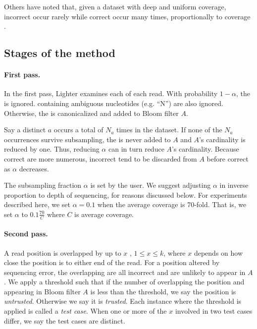 \documentclass{bmcart}
\begin{document}
Others have noted that, given a dataset with deep and uniform coverage, incorrect \kmers occur rarely while correct \kmers occur many times, proportionally to coverage \cite{pevzner2001eulerian, chaisson2004fragment}.

\subsection*{Stages of the method}
\paragraph{First pass.}    In the first pass, Lighter examines each \kmer of each read.  With probability $1 - \alpha$, the \kmer is ignored.  \kmers containing ambiguous nucleotides (e.g. ``N'') are also ignored.  Otherwise, the \kmer is canonicalized and added to Bloom filter $A$.

Say a distinct \kmer $a$ occurs a total of $N_a$ times in the dataset.  If none of the $N_a$ occurrences survive subsampling, the \kmer is never added to $A$ and $A$'s cardinality is reduced by one.  Thus, reducing $\alpha$ can in turn reduce $A$'s cardinality.  Because correct \kmers are more numerous, incorrect \kmers tend to be discarded from $A$ before correct \kmers as $\alpha$ decreases.

The subsampling fraction $\alpha$ is set by the user.  We suggest adjusting $\alpha$ in inverse proportion to depth of sequencing, for reasons discussed below.  For experiments described here, we set $\alpha=0.1$ when the average coverage is 70-fold.  That is, we set $\alpha$ to $0.1\frac{70}{C}$ where $C$ is average coverage.

\paragraph{Second pass.} 
A read position is overlapped by up to $x$ \kmers, $1\le x\le k$, where $x$ depends on how close the position is to either end of the read.
For a position altered by sequencing error, the overlapping \kmers are all incorrect and are unlikely to appear in $A$.
We apply a threshold such that if the number of \kmers overlapping the position and appearing in Bloom filter $A$ is less than the threshold, we say the position is \emph{untrusted}.
Otherwise we say it is \emph{trusted}.
Each instance where the threshold is applied is called a \emph{test case}.
When one or more of the $x$ \kmers involved in two test cases differ, we say the test cases are distinct.
\end{document}
